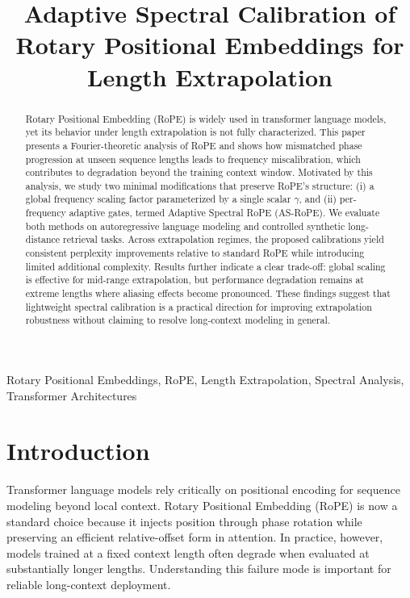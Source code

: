\documentclass[conference]{IEEEtran}
\title{Adaptive Spectral Calibration of Rotary Positional Embeddings for Length Extrapolation}
\author{
\IEEEauthorblockN{Nilesh Mishra\IEEEauthorrefmark{1} and Jay Prakash\IEEEauthorrefmark{2}}
\IEEEauthorblockA{
\textit{Department of Computer Science and Engineering} \\
\textit{National Institute of Technology, Calicut, India}\\
}
}
\begin{document}
\maketitle

\begin{abstract}
Rotary Positional Embedding (RoPE) is widely used in transformer language models, yet its behavior under length extrapolation is not fully characterized. This paper presents a Fourier-theoretic analysis of RoPE and shows how mismatched phase progression at unseen sequence lengths leads to frequency miscalibration, which contributes to degradation beyond the training context window. Motivated by this analysis, we study two minimal modifications that preserve RoPE’s structure: (i) a global frequency scaling factor parameterized by a single scalar $\gamma$, and (ii) per-frequency adaptive gates, termed Adaptive Spectral RoPE (AS-RoPE). We evaluate both methods on autoregressive language modeling and controlled synthetic long-distance retrieval tasks. Across extrapolation regimes, the proposed calibrations yield consistent perplexity improvements relative to standard RoPE while introducing limited additional complexity. Results further indicate a clear trade-off: global scaling is effective for mid-range extrapolation, but performance degradation remains at extreme lengths where aliasing effects become pronounced. These findings suggest that lightweight spectral calibration is a practical direction for improving extrapolation robustness without claiming to resolve long-context modeling in general.
\end{abstract}

\begin{IEEEkeywords}
Rotary Positional Embeddings, RoPE, Length Extrapolation, Spectral Analysis, Transformer Architectures
\end{IEEEkeywords}

\section{Introduction}
Transformer language models rely critically on positional encoding for sequence modeling beyond local context. Rotary Positional Embedding (RoPE) is now a standard choice because it injects position through phase rotation while preserving an efficient relative-offset form in attention. In practice, however, models trained at a fixed context length often degrade when evaluated at substantially longer lengths. Understanding this failure mode is important for reliable long-context deployment.
\end{document}

